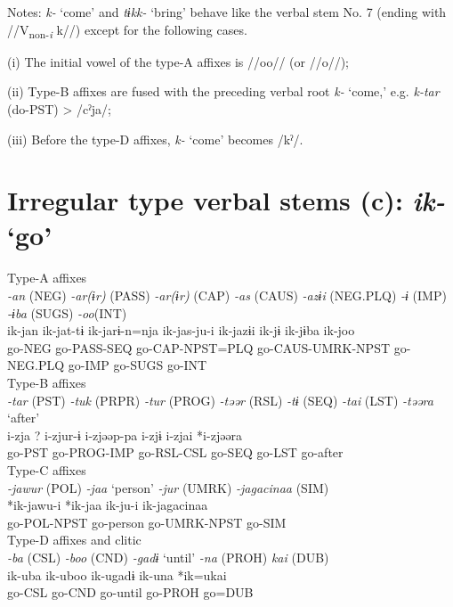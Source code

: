 Notes: \textit{k-} ‘come’ and \textit{tɨkk-} ‘bring’ behave like the verbal stem No. 7 (ending with //V\textsubscript{non-}\textit{\textsubscript{i}} k//) except for the following cases.

(i)  The initial vowel of the type-A affixes is //oo// (or //o//);

(ii)  Type-B affixes are fused with the preceding verbal root \textit{k-} ‘come,’ e.g. \textit{k-tar} (do-PST) > /cˀja/;

(iii)  Before the type-D affixes, \textit{k-} ‘come’ becomes /kˀ/.

\section{Irregular type verbal stems (c): \textit{ik-} ‘go’}

\ea Type-A affixes\\
\glll \textit{-an} (NEG)  \textit{-ar(ɨr)} (PASS)  \textit{-ar(ɨr)} (CAP)  \textit{-as} (CAUS)  \textit{-azɨi} (NEG.PLQ)  \textit{-ɨ} (IMP)  \textit{-ɨba} (SUGS)  \textit{-oo}(INT)\\
ik-jan  ik-jat-tɨ  ik-jarɨ-n=nja  ik-jas-ju-i  ik-jazɨi  ik-jɨ  ik-jɨba  ik-joo\\
go-NEG  go-PASS-SEQ  go-CAP-NPST=PLQ  go-CAUS-UMRK-NPST  go-NEG.PLQ  go-IMP  go-SUGS  go-INT\\


\ex Type-B affixes\\
\glll \textit{-tar} (PST)  \textit{-tuk} (PRPR)  \textit{-tur} (PROG)  \textit{-təər} (RSL)  \textit{-tɨ} (SEQ)  \textit{-tai} (LST)  \textit{-təəra} ‘after’\\
i-zja  ?  i-zjur-ɨ  i-zjəəp-pa  i-zjɨ  i-zjai  *i-zjəəra\\
go-PST    go-PROG-IMP  go-RSL-CSL  go-SEQ  go-LST  go-after\\


\ex Type-C affixes\\
\glll \textit{-jawur} (POL)  \textit{-jaa} ‘person’  \textit{-jur} (UMRK)  \textit{-jagacinaa} (SIM)\\
*ik-jawu-i  *ik-jaa  ik-ju-i  ik-jagacinaa\\
go-POL-NPST  go-person  go-UMRK-NPST  go-SIM\\


\ex Type-D affixes and clitic\\
\glll \textit{-ba} (CSL)  \textit{-boo} (CND)  \textit{-gadɨ} ‘until’  \textit{-na} (PROH)  \textit{kai} (DUB)\\
ik-uba  ik-uboo  ik-ugadɨ  ik-una  *ik=ukai\\
go-CSL  go-CND  go-until  go-PROH  go=DUB\\
\z

